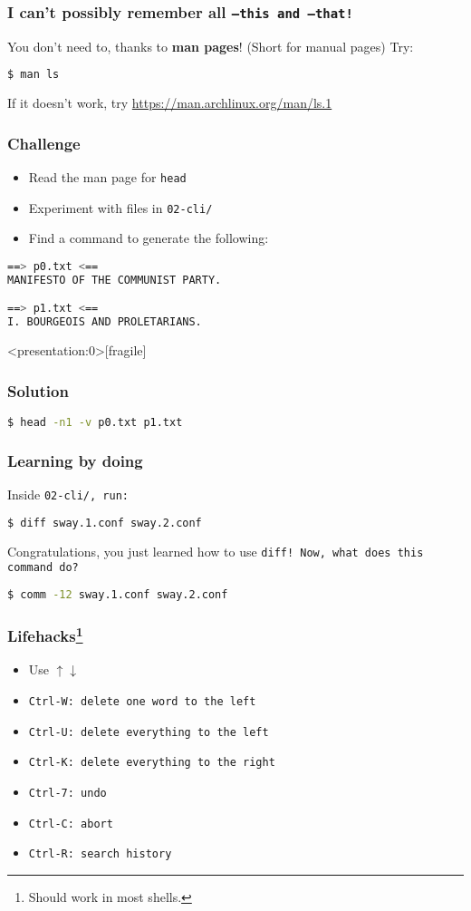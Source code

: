 \begin{frame}[fragile]
\frametitle{I can't possibly remember all \tt{--this} and \tt{--that}!}
You don't need to, thanks to \textbf{man pages}! (Short for manual pages)
\newline \newline
Try:
\begin{lstlisting}[language=bash]
$ man ls
\end{lstlisting}

If it doesn't work, try \url{https://man.archlinux.org/man/ls.1}
\end{frame}

\begin{frame}[fragile]
\frametitle{Challenge}
\begin{itemize}
    \item Read the man page for \tt{head}
    \item Experiment with files in \tt{02-cli/}
    \item Find a command to generate the following:
\end{itemize}
\begin{lstlisting}[language=bash]
==> p0.txt <==
MANIFESTO OF THE COMMUNIST PARTY.

==> p1.txt <==
I. BOURGEOIS AND PROLETARIANS.
\end{lstlisting}
\end{frame}

\begin{frame}<presentation:0>[fragile]
\frametitle{Solution}
\begin{lstlisting}[language=bash]
$ head -n1 -v p0.txt p1.txt
\end{lstlisting}
\end{frame}

\begin{frame}[fragile]
\frametitle{Learning by doing}
Inside \tt{02-cli/}, run:
\begin{lstlisting}[language=bash]
$ diff sway.1.conf sway.2.conf
\end{lstlisting}
Congratulations, you just learned how to use \tt{diff}!
\newline \newline
Now, what does this command do?
\begin{lstlisting}[language=bash]
$ comm -12 sway.1.conf sway.2.conf
\end{lstlisting}
\end{frame}

\begin{frame}
\frametitle{Lifehacks\footnote{Should work in most shells.}}
\begin{itemize}
    \item Use $\uparrow \downarrow$
    \item \tt{Ctrl-W}: delete one word to the left
    \item \tt{Ctrl-U}: delete everything to the left
    \item \tt{Ctrl-K}: delete everything to the right
    \item \tt{Ctrl-7}: undo
    \item \tt{Ctrl-C}: abort
    \item \tt{Ctrl-R}: search history
\end{itemize}
\end{frame}
